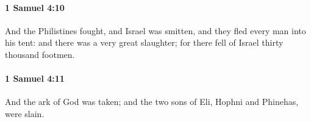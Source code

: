 		\paragraph{1 Samuel 4:10} %
			\label{1SAMUEL-4-10}

			And the Philistines fought, and Israel was smitten, and they fled every man into his tent: and there was a very great slaughter; for there fell of Israel thirty thousand footmen.


		\paragraph{1 Samuel 4:11} %
			\label{1SAMUEL-4-11}

			And the ark of God was taken; and the two sons of Eli, Hophni and Phinehas, were slain.



